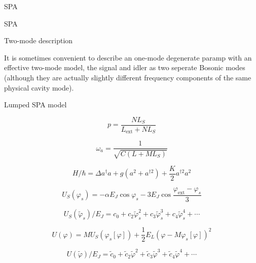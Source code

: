 \begin{section}{SPA}

SPA



\begin{subsection}{Two-mode description}

It is sometimes convenient to describe an one-mode degenerate paramp with an effective two-mode model, the signal and idler as two seperate Bosonic modes (although they are actually slightly different frequency components of the same physical cavity mode). 




\end{subsection}




\begin{subsection}{Lumped SPA model}


\begin{equation}\label{eq:lumped_participation}
p = \frac{N L_S}{L_\mathrm{ext} + N L_S}
\end{equation}

\begin{equation}\label{eq:lumped_omega_a}
\omega_a = \frac{1}{\sqrt{C(L+M L_S)}}
\end{equation}

\begin{equation}\label{eq:Hamiltonian}
H/\hbar = \Delta a^\dagger a + g \left( a^2 + a^{\dagger2} \right) + \frac{K}{2} a^{\dagger2} a^2
\end{equation}



\begin{equation}\label{eq:U_S}
U_S(\varphi_s) = -\alpha E_J \cos{\varphi_s}-3 E_J \cos{\frac{\varphi_\mathrm{ext}-\varphi_s}{3}}
\end{equation}

\begin{equation}\label{eq:U_S_alter}
U_S(\tilde{\varphi}_s)/E_J = c_0 + c_2 \tilde{\varphi}_s^2 + c_3 \tilde{\varphi}_s^3 + c_4 \tilde{\varphi}_s^4 + \cdots
\end{equation}

\begin{equation}
U(\varphi) = M U_S (\varphi_s[\varphi]) + \frac{1}{2}E_L (\varphi - M \varphi_s[\varphi])^2
\end{equation}

\begin{equation}
U(\tilde{\varphi}) /E_J = \tilde{c}_0 + \tilde{c}_2 \tilde{\varphi}^2 + \tilde{c}_3 \tilde{\varphi}^3 + \tilde{c}_4 \tilde{\varphi}^4 + \cdots
\end{equation}


\end{subsection}
\end{section}
